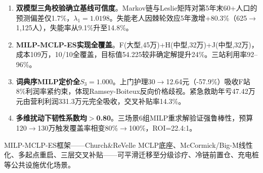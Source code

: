 \documentclass[12pt,a4paper]{ctexart}
\begin{document}
\begin{enumerate}[label=\textbf{(\arabic*)}, leftmargin=*]
    \item \textbf{双模型三角校验确立基线可信度}。Markov链与Leslie矩阵对第5年末60+人口的预测偏差仅1.7\%，$\lambda_1=1.0198$。失能老人因棘轮效应5年激增+80.3\%（625$\to$1,125人），失能率从9.1\%升至14.8\%。
    \item \textbf{MILP-MCLP-ES实现全覆盖}。F(大型,45万)+H(中型,32万)+J(中型,32万)，成本109万，10/10全覆盖，目标值54.225较非确定解提升24\%。三站利用率92--96\%。
    \item \textbf{词典序MILP定价全$S_3=1.000$}。上门护理30$\to$12.64元（-57.9\%）吸收F站8\%利润率紧约束，体现Ramsey-Boiteux反向价格歧视。紧急救助年亏47.42万元由营利利润331.3万元完全吸收，交叉补贴率14.3\%。
    \item \textbf{多维扰动下韧性系数均$>$0.80}。三场景6组MILP重求解验证强鲁棒性，预算120$\to$130万触发覆盖率相变80\%$\to$100\%，ROI=22.4:1。
\end{enumerate}

MILP-MCLP-ES框架——Church\&ReVelle MCLP底座、McCormick/Big-M线性化、多起点重启、三层交叉补贴——可平滑迁移至分级诊疗、冷链前置仓、充电桩等公共设施优化场景。
\end{document}
